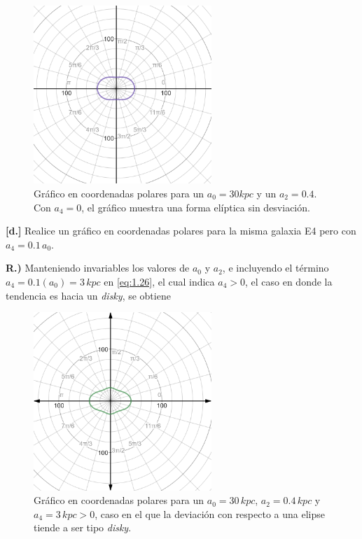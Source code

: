 \documentclass[paper=a4, fontsize=10pt]{scrartcl} %
\begin{document}
\begin{figure}[h]
\begin{center}
\includegraphics[width=0.6\textwidth]{graf_c_con_lineas}
\caption{\small{Gráfico en coordenadas polares para un $a_0 = 30 kpc$ y un $a_2 = 0.4$. Con $a_4 = 0$, el gráfico muestra una forma elíptica sin desviación.}}
\label{fig:1.1} 
\end{center}
\end{figure}

{\bf{[d.]}} Realice un gráfico en coordenadas polares para la misma galaxia E4 pero con $a_4 = 0.1\,a_0$.


\vspace{0.4cm} 

{\bf{R.)}} Manteniendo invariables los valores de $a_0$ y $a_2$, e incluyendo el término $a_4 = 0.1(a_0) = 3 \,kpc$ en \eqref{eq:1.26}, el cual indica $a_4 > 0$, el caso en donde la tendencia es hacia un {\textit{disky}}, se obtiene 

\begin{figure}[h]
\begin{center}
\includegraphics[width=0.6\textwidth]{graf_d_con_lineas}
\caption{\small{Gráfico en coordenadas polares para un $a_0 = 30 \, kpc$, $a_2 = 0.4 \, kpc$ y  $a_4 =3  \, kpc > 0$, caso en el que la deviación con respecto a una elipse tiende a ser tipo {\textit{disky}}.}}
\label{fig:1.2} 
\end{center}
\end{figure}
\end{document}
